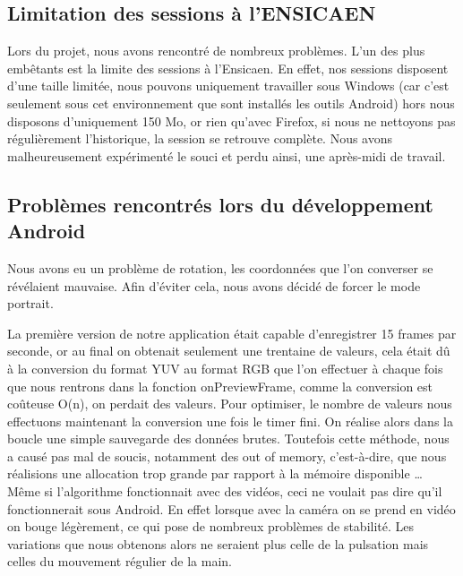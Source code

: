 \subsection{Limitation des sessions à l'ENSICAEN}

Lors du projet, nous avons rencontré de nombreux problèmes. L'un des plus embêtants est la limite des sessions à l'Ensicaen. En effet, nos sessions disposent d'une taille limitée, nous pouvons uniquement travailler sous Windows (car
c'est seulement sous cet environnement que sont installés les outils Android) hors nous disposons d'uniquement 150 Mo, or rien qu'avec Firefox, si nous ne nettoyons pas régulièrement l'historique, la session se retrouve
complète. Nous avons malheureusement expérimenté le souci et perdu ainsi, une après-midi de travail.

\subsection{Problèmes rencontrés lors du développement Android}

Nous avons eu un problème de rotation, les coordonnées que l'on converser se révélaient mauvaise. Afin d'éviter cela, nous avons décidé de forcer le mode portrait.

La première version de notre application était capable d'enregistrer 15 frames par seconde, or au final on obtenait seulement une trentaine de valeurs, cela était dû à la conversion du format YUV au format RGB que l'on
effectuer à chaque fois que nous rentrons dans la fonction onPreviewFrame, comme la conversion est coûteuse O(n), on perdait des valeurs. Pour optimiser, le nombre de valeurs nous effectuons maintenant la conversion
une fois le timer fini. On réalise alors dans la boucle une simple sauvegarde des données brutes.
Toutefois cette méthode, nous a causé pas mal de soucis, notamment des out of memory, c'est-à-dire, que nous réalisions une allocation trop grande par rapport à la mémoire disponible \ldots{}
\\
Même si l'algorithme fonctionnait avec des vidéos, ceci ne voulait pas dire qu'il fonctionnerait sous Android.
En effet lorsque avec la caméra on se prend en vidéo on bouge légèrement, ce qui pose de nombreux problèmes de stabilité.
Les variations que nous obtenons alors ne seraient plus celle de la pulsation mais celles du mouvement régulier de la main.


